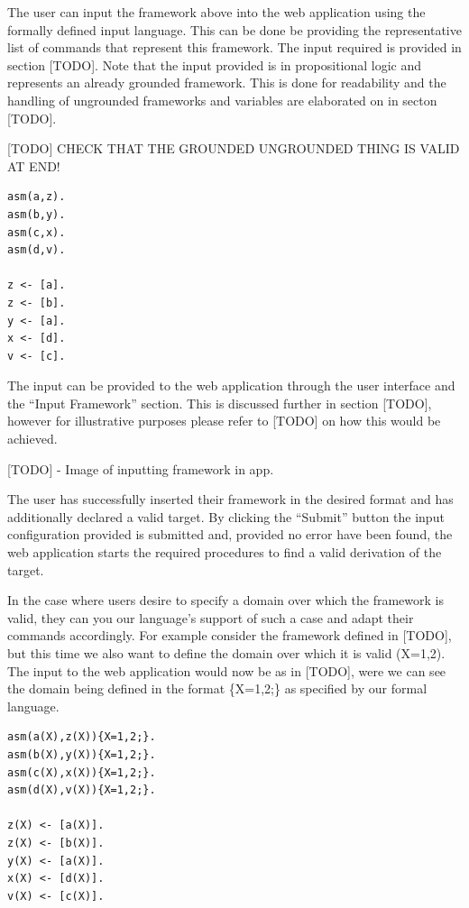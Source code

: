 The user can input the framework  above into the web application using the formally defined input language. This can be done be providing the representative list of commands that represent this framework. The input required is provided in section [TODO]. Note that the input provided is in propositional logic and represents an already grounded framework. This is done for readability and the handling of ungrounded frameworks and variables are elaborated on in secton [TODO]. 

[TODO] CHECK THAT THE GROUNDED UNGROUNDED THING IS VALID AT END!

\begin{Verbatim}[frame=single]
asm(a,z).
asm(b,y).
asm(c,x).
asm(d,v).

z <- [a].
z <- [b].
y <- [a].
x <- [d].
v <- [c].
\end{Verbatim}

The input can be provided to the web application through the user interface and the ``Input Framework'' section. This is discussed further in section [TODO], however for illustrative purposes please refer to [TODO] on how this would be achieved.

[TODO] - Image of inputting framework in app.

The user has successfully inserted their framework in the desired format and has additionally declared a valid target. By clicking the ``Submit'' button the input configuration provided is submitted and, provided no error have been found, the web application starts the required procedures to find a valid derivation of the target.

In the case where users desire to specify a domain over which the framework is valid, they can you our language's support of such a case and adapt their commands accordingly. For example consider the framework defined in [TODO], but this time we also want to define the domain over which it is valid (X=1,2). The input to the web application would now be as in [TODO], were we can see the domain being defined in the format \{X=1,2;\} as specified by our formal language.

\begin{Verbatim}[frame=single]
asm(a(X),z(X)){X=1,2;}.
asm(b(X),y(X)){X=1,2;}.
asm(c(X),x(X)){X=1,2;}.
asm(d(X),v(X)){X=1,2;}.

z(X) <- [a(X)].
z(X) <- [b(X)].
y(X) <- [a(X)].
x(X) <- [d(X)].
v(X) <- [c(X)].
\end{Verbatim}